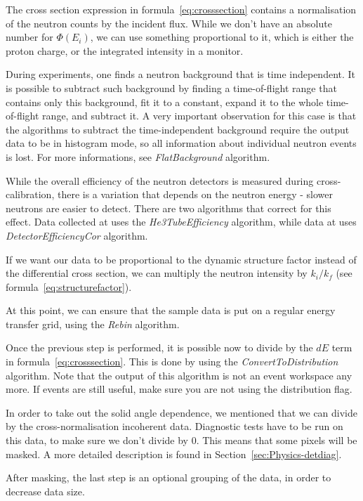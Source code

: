 The cross section expression in formula~\ref{eq:crosssection} contains a normalisation of the neutron counts by the incident flux. While we don't have an absolute number for $\Phi(E_i)$, we can use something proportional to it, which is either the proton charge,  or the integrated intensity in a monitor.

During experiments, one finds a neutron background that is time independent. It is possible to subtract such background by finding a time-of-flight range that contains only this background, fit it to a constant, expand it to the whole time-of-flight range, and subtract it. A very important observation for this case is that the algorithms to subtract the time-independent background require the output data to be in histogram mode, so all information about individual neutron events is lost. For more informations, see \textit{FlatBackground} algorithm.

While the overall efficiency of the neutron detectors is measured during cross-calibration, there is a variation that depends on the neutron energy - slower neutrons are easier to detect. There are two algorithms that correct for this effect. Data collected at \sns{} uses the \textit{He3TubeEfficiency} algorithm, while data at \isis{} uses \textit{DetectorEfficiencyCor} algorithm.

If we want our data to be proportional to the dynamic structure factor instead of the differential cross section, we can multiply the neutron intensity by $k_i/k_f$ (see formula~\ref{eq:structurefactor}). 

At this point, we can ensure that the sample data is put on a regular energy transfer grid, using the \textit{Rebin} algorithm.

Once the previous step is performed, it is possible now to divide by the $dE$ term in formula~\ref{eq:crosssection}. This is done by using the \textit{ConvertToDistribution} algorithm. Note that the output of this algorithm is not an event workspace any more. If events are still useful, make sure you are not using the distribution flag. 

In order to take out the solid angle dependence, we mentioned that we can divide by the cross-normalisation incoherent data. Diagnostic tests have to be run on this data, to make sure we don't divide by 0. This means that some pixels will be masked. A more detailed description is found in Section~\ref{sec:Physics-detdiag}. 

After masking, the last step is an optional grouping of the data, in order to decrease data size.

